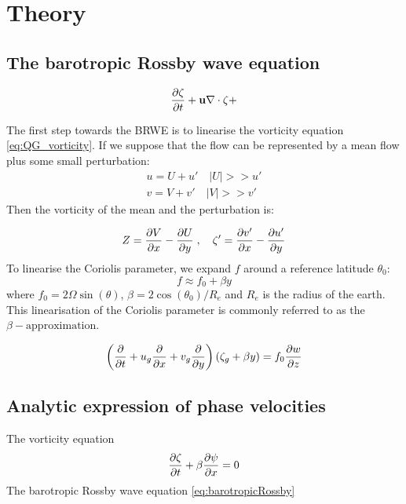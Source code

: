 \section{Theory}
\subsection{The barotropic Rossby wave equation}
\begin{equation}
    \pdv{\zeta}{t} + \mathbf{u} \nabla \cdot \zeta + 
\end{equation}

The first step towards the BRWE is to linearise the vorticity equation 
\cref{eq:QG_vorticity}. If we suppose that the flow can be represented by a
mean flow plus some small perturbation: 
\begin{equation}\label{eq:VeloctiyPertubation}
    \begin{split}
    u = U + u' \quad  |U| >> u' \\
    v = V + v' \quad  |V| >> v'
    \end{split}
\end{equation}
Then the vorticity of the mean and the perturbation is: 

\begin{equation}\label{eq:VortPertubation}
    Z = \pdv{V}{x} - \pdv{U}{y} \; , \quad \zeta' = \pdv{v'}{x} - \pdv{u'}{y} 
\end{equation}
To linearise the Coriolis parameter, we expand $f$
around a reference latitude $\theta_0$: 
\begin{equation}
    f \approx f_0 + \beta y
\end{equation} 
where $f_0 = 2\Omega \sin(\theta)$, $\beta = 2\cos (\theta_0)/R_e$ and $R_e$ is
the radius of the earth. This linearisation of the Coriolis parameter is
commonly referred to as the $\beta-\mathrm{approximation}$.


\begin{equation}\label{eq:QG_vort}
    \left(\pdv{}{t}+u_g \pdv{}{x} + v_g \pdv{}{y} \right)(\zeta_g + \beta y) =
    f_0 \pdv{w}{z}
\end{equation}

\subsection{Analytic expression of phase velocities}

The vorticity equation
\begin{equation}\label{eq:gov_vort}
    \pdv{\zeta}{t} + \beta \pdv{\psi}{x} = 0
\end{equation}
The barotropic Rossby wave equation \cref{eq:barotropicRossby}

